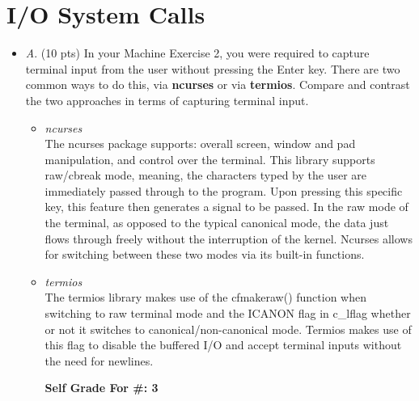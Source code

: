\documentclass[conference]{IEEEtran}
\begin{document}
\section{I/O System Calls}
\begin{itemize}
	\item \textit{A}. (10 pts) In your Machine Exercise 2, you were required to capture terminal input from the
	user without pressing the Enter key. There are two common ways to do this, via \textbf{ncurses}
	or via \textbf{termios}. Compare and contrast the two approaches in terms of capturing terminal
	input.
	\begin{itemize} 
		\item \textit{ncurses} \\
		The ncurses package supports: overall screen, window and pad manipulation, and control over the terminal. This library supports raw/cbreak mode, meaning, the characters typed by the user are immediately passed through to the program. Upon pressing this specific key, this feature then generates a signal to be passed. In the raw mode of the terminal, as opposed to the typical canonical mode, the data just flows through freely without the interruption of the kernel. Ncurses allows for switching between these two modes via its built-in functions.
		\item \textit{termios} \\
		The termios library makes use of the cfmakeraw() function when switching to raw terminal mode and the ICANON flag in c\_lflag whether or not it switches to canonical/non-canonical mode. Termios makes use of this flag to disable the buffered I/O and accept terminal inputs without the need for newlines.		\begin{center}
			\textbf{Self Grade For \#: 3}
		\end{center}
	\end{itemize}
\end{itemize}
\end{document}

